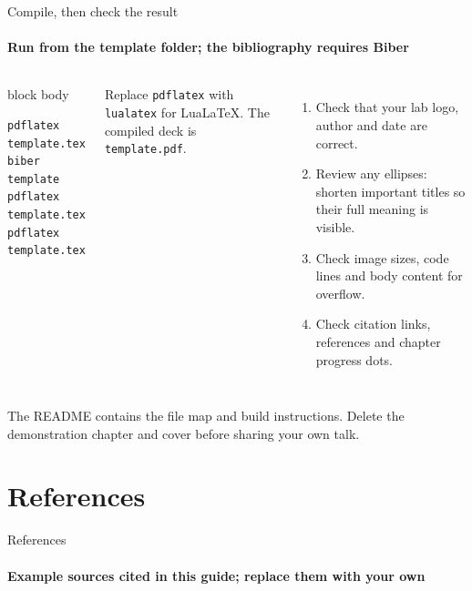 \documentclass[aspectratio=169,10pt]{beamer}
\begin{document}
\begin{frame}[fragile]{Compile, then check the result}
  \framesubtitle{Run from the template folder; the bibliography requires Biber}
  \begin{columns}[T,onlytextwidth]
      \begin{beamercolorbox}[wd=\linewidth,sep=3mm,rounded=true]{block body}
\small
\begin{Verbatim}
pdflatex template.tex
biber template
pdflatex template.tex
pdflatex template.tex
\end{Verbatim}
      \end{beamercolorbox}
      \small Replace \texttt{pdflatex} with \texttt{lualatex} for LuaLaTeX. The compiled deck is \texttt{template.pdf}.
      \begin{enumerate}
        \item Check that your lab logo, author and date are correct.
        \item Review any ellipses: shorten important titles so their full meaning is visible.
        \item Check image sizes, code lines and body content for overflow.
        \item Check citation links, references and chapter progress dots.
      \end{enumerate}
  \end{columns}
  \vfill
  \textcolor{DASEslate}{\small The README contains the file map and build instructions. Delete the demonstration chapter and cover before sharing your own talk.}
\end{frame}

\section*{References}
\begin{frame}[t,allowframebreaks]{References}
  \framesubtitle{Example sources cited in this guide; replace them with your own}
  \printbibliography[heading=none]
\end{frame}

\begin{frame}[plain]
\end{frame}
\end{document}

